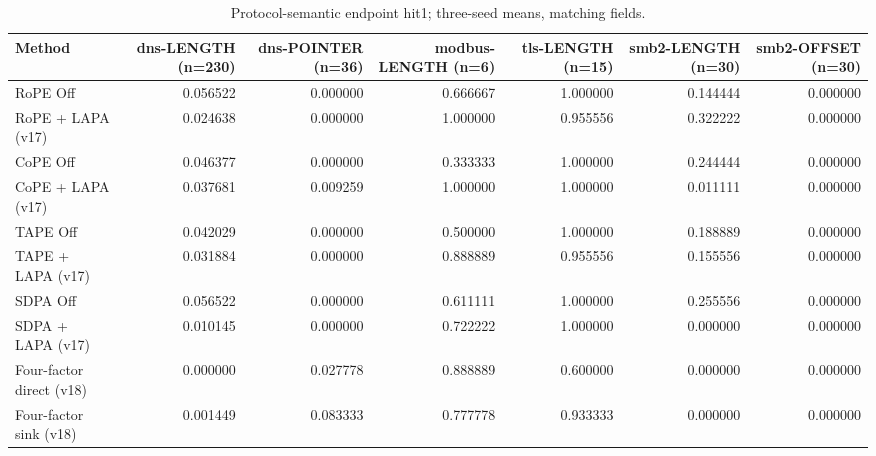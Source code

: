 \begin{table}[t]
\centering
\scriptsize
\caption{Protocol-semantic endpoint hit1; three-seed means, matching fields.}
\begin{tabular}{lrrrrrr}
\toprule
Method & dns-LENGTH (n=230) & dns-POINTER (n=36) & modbus-LENGTH (n=6) & tls-LENGTH (n=15) & smb2-LENGTH (n=30) & smb2-OFFSET (n=30) \\
\midrule
RoPE Off & 0.056522 & 0.000000 & 0.666667 & 1.000000 & 0.144444 & 0.000000 \\
RoPE + LAPA (v17) & 0.024638 & 0.000000 & 1.000000 & 0.955556 & 0.322222 & 0.000000 \\
CoPE Off & 0.046377 & 0.000000 & 0.333333 & 1.000000 & 0.244444 & 0.000000 \\
CoPE + LAPA (v17) & 0.037681 & 0.009259 & 1.000000 & 1.000000 & 0.011111 & 0.000000 \\
TAPE Off & 0.042029 & 0.000000 & 0.500000 & 1.000000 & 0.188889 & 0.000000 \\
TAPE + LAPA (v17) & 0.031884 & 0.000000 & 0.888889 & 0.955556 & 0.155556 & 0.000000 \\
SDPA Off & 0.056522 & 0.000000 & 0.611111 & 1.000000 & 0.255556 & 0.000000 \\
SDPA + LAPA (v17) & 0.010145 & 0.000000 & 0.722222 & 1.000000 & 0.000000 & 0.000000 \\
Four-factor direct (v18) & 0.000000 & 0.027778 & 0.888889 & 0.600000 & 0.000000 & 0.000000 \\
Four-factor sink (v18) & 0.001449 & 0.083333 & 0.777778 & 0.933333 & 0.000000 & 0.000000 \\
\bottomrule
\end{tabular}
\end{table}
